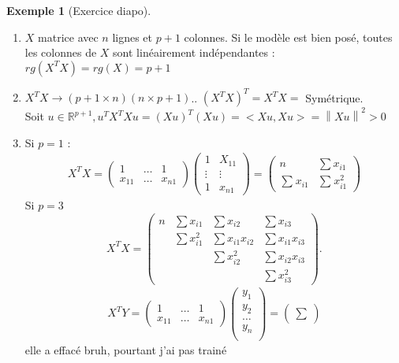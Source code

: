 \documentclass{article}
\theoremstyle{plain}%
\theoremstyle{definition}
\newtheorem{exmp}{Exemple}[section]
\theoremstyle{remark}
\begin{document}
\begin{exmp}[Exercice diapo]
    \begin{enumerate}
        \item $ X $ matrice avec $ n $ lignes et $ p+1 $ colonnes. Si le modèle est bien posé, toutes les colonnes de $ X $ sont linéairement indépendantes : $ rg(X^TX) = rg(X) = p+1 $ 
        \item $ X^T X \to (p+1 \times n)(n \times p+1) $.. $ (X^TX)^T = X^T X = $ Symétrique. \\ 
            Soit $ u \in \mathbb{R}^{p+1}, u^T X^T X u = (Xu)^T(Xu) = <Xu, Xu> = \left\| Xu \right\| ^2 > 0 $ 
        \item Si $ p=1 $ : \begin{align*}
            X^TX = \begin{pmatrix}
                1& \dots &1 \\
                x_{11} & \dots & x_{n1}
            \end{pmatrix} \begin{pmatrix}
                1 & X_{11} \\
                \vdots & \vdots \\
                1 & x_{n1}
            \end{pmatrix}
            = \begin{pmatrix}
                n & \sum x_{i1} \\
                \sum_{}^{}x_{i1} & \sum_{}^{}x_{i1}^2
            \end{pmatrix}            
        \end{align*}
        Si $ p=3 $ 
        \[
            X^T X = \begin{pmatrix}
                n & \sum x_{i1} & \sum x_{i2} & \sum x_{i3} \\
                ~ & \sum x_{i1}^2 & \sum x_{i1}x_{i2} & \sum x_{i1}x_{i3} \\
                ~ & ~ & \sum x_{i2}^2 & \sum x_{i2}x_{i3} \\
                ~ & ~ & ~ & \sum x_{i3}^2
            \end{pmatrix}
        .\]
        \begin{align*}
            X^T Y = \begin{pmatrix}
                1& \dots &1 \\
                x_{11} & \dots & x_{n1}
            \end{pmatrix} \begin{pmatrix}
                y_1 \\
                y_2 \\
                \dots \\
                y_n \\
            \end{pmatrix} = \begin{pmatrix}
                \sum
            \end{pmatrix}
        \end{align*}
        elle a effacé bruh, pourtant j'ai pas trainé
    \end{enumerate}
\end{exmp}
\end{document}
